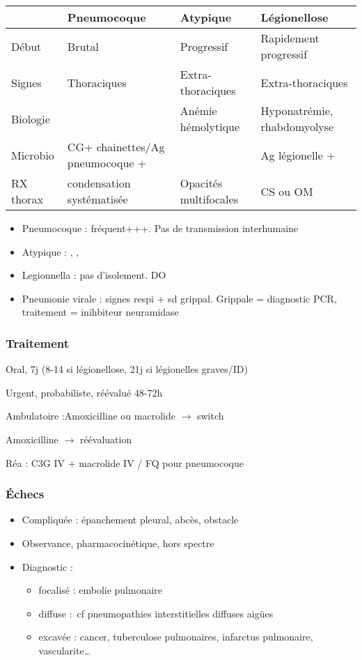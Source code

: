 \documentclass{article}
\begin{document}
\begin{table}[htpb]
  \centering
  \label{Orientation clinique (non discriminant !)}
  \begin{tabular}{llll}
    \toprule
    & Pneumocoque & Atypique & Légionellose\\
    \midrule
    Début & Brutal & Progressif & Rapidement progressif\\
    Signes & Thoraciques & Extra-thoraciques & Extra-thoraciques\\
    Biologie &  & Anémie hémolytique & Hyponatrémie, rhabdomyolyse\\
    Microbio & CG+ chainettes/Ag pneumocoque + &  & Ag légionelle +\\
    RX thorax & condensation systématisée & Opacités multifocales & CS ou OM\\
    \bottomrule
  \end{tabular}
\end{table}

\begin{itemize}
\item Pneumocoque : fréquent+++. Pas de transmission interhumaine
\item Atypique : , , 
\item Legionnella : pas d'isolement. DO
\item Pneumonie virale : signes respi + sd grippal. Grippale = diagnostic PCR, traitement = inihbiteur neuramidase \danger {}
\end{itemize}
\subsubsection{Traitement}
Oral, 7j (8-14 si légionellose, 21j si légionelles graves/ID)

Urgent, probabiliste, réévalué 48-72h

Ambulatoire :Amoxicilline ou macrolide \(\to\) switch

\faHospitalO  Amoxicilline \(\to\) réévaluation

Réa : C3G IV + macrolide IV / FQ pour pneumocoque

\subsubsection{Échecs}
\begin{itemize}
\item Compliquée : épanchement pleural, abcès, obstacle
\item Observance, pharmacocinétique, hors spectre
\item Diagnostic :
  \begin{itemize}
  \item focalisé : embolie pulmonaire
  \item diffuse : cf pneumopathies interstitielles diffuses aigües
  \item excavée : cancer, tuberculose pulmonaires, infarctus pulmonaire, vascularite\ldots{}
  \end{itemize}
\end{itemize}
\end{document}
